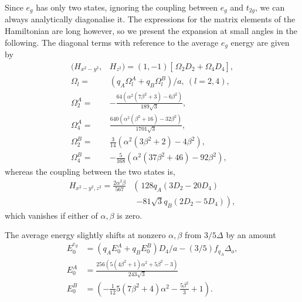 \documentclass[a4paper,prb,twocolumn]{revtex4-1}  %
\newcommand{\com}[1]{}
\begin{document}
Since $e_{g}$ has only two states,
ignoring the coupling between $e_{g}$ and $t_{2g}$,
we can always analytically diagonalise it.
The expressions for the
matrix elements of the Hamiltonian are long however,
so we present the expansion at small angles in the following.
The diagonal terms with reference to the average $e_g$ energy are given by
\begin{align}
\label{eq:eg-hiix}
(H_{x^2-y^2},&H_{z^2}) = (1,-1)
\left[\frac{}{} \Omega_{2}  D_2 + \Omega_4 D_4\right],\\
\Omega_{l} =&  \left(q_A \Omega_{l}^A + q_B\Omega_{l}^B\right)/a,~(l=2,4),\\
\Omega_{2}^A =&  -\frac{64 \left(\alpha ^2 \left(7 \beta ^2+3\right)-6 \beta ^2\right)}{189 \sqrt{3}},\\
\Omega_{4}^A =& \frac{640 \left(\alpha ^2 \left(\beta ^2+16\right)-32 \beta ^2\right)}{1701 \sqrt{3}},\\
\Omega_{2}^B =&  \frac{3}{14} \left(\alpha ^2 \left(3 \beta ^2+2\right)-4 \beta ^2\right),\\
\Omega_{4}^B =& -\frac{5}{168}\left(\alpha ^2 \left(37 \beta ^2+46\right)-92 \beta ^2\right),
\end{align}
whereas the coupling between the two states is,
\begin{align}
\nonumber
H_{x^2-y^2,z^2}=
\frac{2\alpha ^2 \beta}{567} 
&\left(\frac{}{}128 q_A (3 D_2-20 D_4) \right. \\ \label{eq:eg-hijx}
&~~\left. - 81 \sqrt{3} q_B (2 D_2 -5 D_4)\right),
\end{align}
which vanishes if 
either of $\alpha,\beta$ is zero.


The average energy slightly shifts at nonzero $\alpha,\beta$
from $3/5\Delta$ by an amount
\begin{align}
E_0^{e_{g}} &= \left(q_A E_0^A +q_B E_0^B\right)D_4/a - (3/5)f_{q_A}\Delta_o,\\
E_0^A &=
\frac{256 \left(5 \left(4 \beta ^2+1\right) \alpha ^2+5 \beta ^2-3\right)}{243 \sqrt{3}}\\
E_0^B &=
(-\frac{1}{12} 5 \left(7 \beta ^2+4\right) \alpha ^2-\frac{5 \beta ^2}{3}+1).
\end{align}


\com{
\begin{align}
H_{x^2-y^2,z^2}&=
\left[\frac{}{} \Lambda_{2}  D_2 + \Lambda_4 D_4\right],\\
\Lambda_{l} =&  \left(q_A \Lambda_{l}^A + q_B\Lambda_{l}^B\right)/a,~(l=2,4),\\
\Lambda_{2}^A =&
\frac{256 \alpha ^2 \beta }{189},\\
\Lambda_{4}^A =&
-\frac{1}{567} \left(5120 \alpha ^2 \beta \right),\\
\Lambda_{2}^B =&\frac{1}{7} (-4) \sqrt{3} \alpha ^2 \beta ,\\
\Lambda_{4}^B =&\frac{10}{7} \sqrt{3} \alpha ^2 \beta
\end{align}
}
\end{document}

